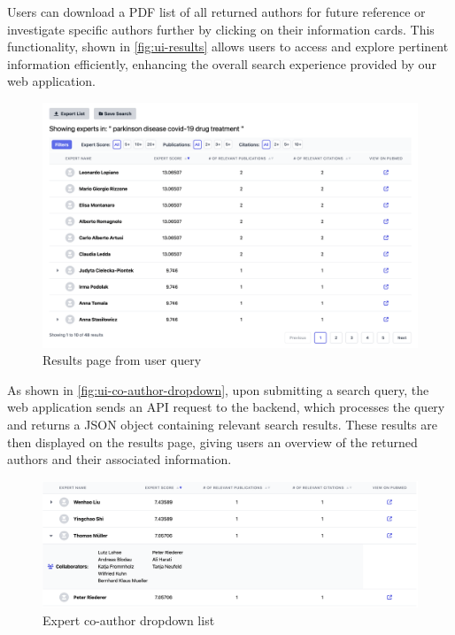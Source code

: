 Users can download a PDF list of all returned authors for future reference or investigate specific authors further by clicking on their information cards. This functionality, shown in \autoref{fig:ui-results} allows users to access and explore pertinent information efficiently, enhancing the overall search experience provided by our web application.
\begin{figure}[ht!]
    \centering
    \includegraphics[width=\figwidth]{Images/ui-results.png}
    \caption{Results page from user query}
    \label{fig:ui-results}
\end{figure}

As shown in \autoref{fig:ui-co-author-dropdown}, upon submitting a search query, the web application sends an API request to the backend, which processes the query and returns a JSON object containing relevant search results. These results are then displayed on the results page, giving users an overview of the returned authors and their associated information.
\begin{figure}[hb!]
    \centering
    \includegraphics[width=\figwidth]{Images/ui-author-card.png}
    \caption{Expert co-author dropdown list}
    \label{fig:ui-co-author-dropdown}
\end{figure}
